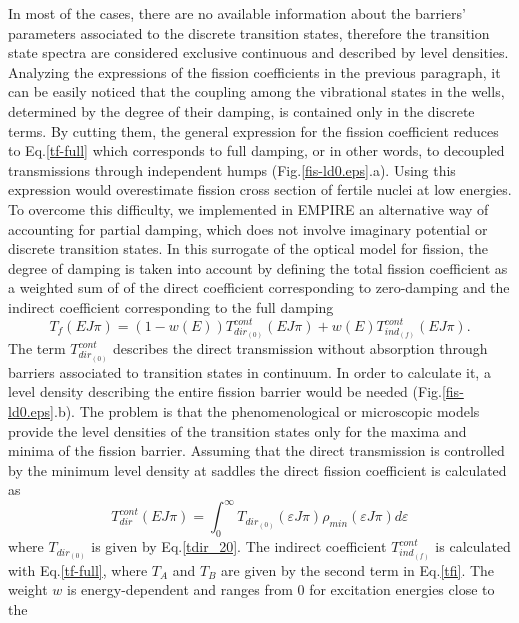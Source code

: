 In most of the cases, there are no available information about the barriers'
parameters associated to the discrete transition states, therefore the
transition state spectra are considered exclusive continuous and described
by level densities. Analyzing the expressions of the fission coefficients in
the previous paragraph, it can be easily noticed that the coupling among the
vibrational states in the wells, determined by the degree of their damping,
is contained only in the discrete terms. By cutting them, the general
expression for the fission coefficient reduces to Eq.\ref{tf-full} which
corresponds to full damping, or in other words, to decoupled transmissions
through independent humps (Fig.\ref{fis-ld0.eps}.a). Using this expression
would overestimate fission cross section of fertile nuclei at low energies.
To overcome this difficulty, we implemented in EMPIRE an alternative way
of accounting for partial damping, which does not involve imaginary potential or
discrete transition states. In this surrogate of the optical model for
fission, the degree of damping is taken into account by defining the total
fission coefficient as a weighted sum of of the direct coefficient
corresponding to zero-damping and the indirect coefficient corresponding to the
full damping
\begin{equation}
T_{f}(E J \pi)=(1-w(E))T_{dir_{(0)}}^{cont}(E J
\pi)+w(E)T_{ind_{(f)}}^{cont}(E J \pi).  \label{tfsurr}
\end{equation}
The term $T_{dir_{(0)}}^{cont}$ describes the direct transmission without
absorption through barriers associated to transition states in continuum. In
order to calculate it, a level density describing the entire fission barrier
would be needed (Fig.\ref{fis-ld0.eps}.b). The problem is that the
phenomenological or microscopic models provide the level densities of the
transition states only for the maxima and minima of the fission barrier.
Assuming that the direct transmission is controlled by the
minimum level density at saddles the direct fission coefficient is
calculated as
\begin{equation}
T_{dir}^{cont}(EJ\pi)=\int_0^{\infty}T_{dir_{(0)}}(\varepsilon J
\pi)\rho_{min} (\varepsilon J \pi) d \varepsilon
\end{equation}
where $T_{dir_{(0)}}$ is given by Eq.\ref{tdir_20}. The indirect coefficient
$T_{ind_{(f)}}^{cont}$ is calculated with Eq.\ref{tf-full}, where $T_A$ and $%
T_B$ are given by the second term in Eq.\ref{tfi}. The weight $w$ is
energy-dependent and ranges from 0 for excitation energies close to the
